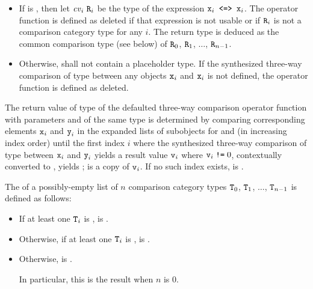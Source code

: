 \begin{itemize}
\item
If  is , then
let $\cv{}_i~\tcode{R}_i$ be
the type of the expression $\texttt{x}_i\texttt{ <=> }\texttt{x}_i$.
The operator function is defined as deleted
if that expression is not usable or
if $\texttt{R}_i$ is not
a comparison category type for any $i$.
The return type is deduced as
the common comparison type (see below) of
$\texttt{R}_0$, $\texttt{R}_1$, $\dotsc$, $\texttt{R}_{n-1}$.
\item
Otherwise,  shall not contain a placeholder type.
If the synthesized three-way comparison of type 
between any objects $\texttt{x}_i$ and $\texttt{x}_i$
is not defined,
the operator function is defined as deleted.
\end{itemize}

\pnum
The return value  of type 
of the defaulted three-way comparison operator function
with parameters  and  of the same type
is determined by comparing corresponding elements
$\texttt{x}_i$ and $\texttt{y}_i$
in the expanded lists of subobjects for  and 
(in increasing index order)
until the first index $i$ where
the synthesized three-way comparison of type 
between $\texttt{x}_i$ and $\texttt{y}_i$
yields a result value $\texttt{v}_i$ where $\texttt{v}_i \mathrel{\texttt{!=}} 0$,
contextually converted to , yields ;
 is a copy of $\texttt{v}_i$.
If no such index exists,  is
.

\pnum
The  
of a possibly-empty list of $n$ comparison category types
$\texttt{T}_0$, $\texttt{T}_1$, $\dotsc$, $\texttt{T}_{n-1}$
is defined as follows:

\begin{itemize}
\item
If at least one $\texttt{T}_i$ is ,
 is .

\item
Otherwise, if at least one $\texttt{T}_i$ is ,
 is .

\item
Otherwise,  is .
\begin{note}
In particular, this is the result when $n$ is 0.
\end{note}
\end{itemize}

